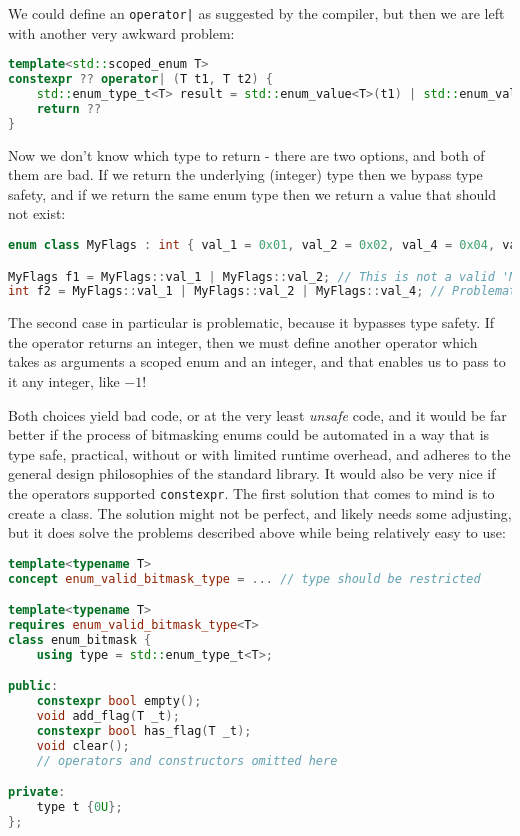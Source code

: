 \documentclass[
  format=manuscript,
  screen=true,
  review=false,
  nonacm=true,
  timestamp=true,
  balance=false]{acmart}
\newcommand{\beforecodespace}{\vspace{4mm}}
\begin{document}
We could define an \texttt{operator|} as suggested by the compiler, but then we are
left with another very awkward problem:

\beforecodespace\begin{lstlisting}[language=Cpp]
template<std::scoped_enum T>
constexpr ?? operator| (T t1, T t2) {
    std::enum_type_t<T> result = std::enum_value<T>(t1) | std::enum_value<T>(t2);
    return ??
}
\end{lstlisting}

\noindent
Now we don't know which type to return - there are two options, and both of them are
bad. If we return the underlying (integer) type then we bypass type safety, and if
we return the same enum type then we return a value that should not exist:

\beforecodespace\begin{lstlisting}[language=Cpp]
enum class MyFlags : int { val_1 = 0x01, val_2 = 0x02, val_4 = 0x04, val_8 = 0x08 };

MyFlags f1 = MyFlags::val_1 | MyFlags::val_2; // This is not a valid 'MyFlags' !
int f2 = MyFlags::val_1 | MyFlags::val_2 | MyFlags::val_4; // Problematic!
\end{lstlisting}

The second case in particular is problematic, because it bypasses type safety.
If the operator returns an integer, then we must define another operator which
takes as arguments a scoped enum and an integer, and that enables us to pass to
it any integer, like $-1$!

\noindent
Both choices yield bad code, or at the very least \textit{unsafe} code, and it
would be far better if the process of bitmasking enums could be automated in a
way that is type safe, practical, without or with limited runtime overhead, and
adheres to the general design philosophies of the standard library. It would
also be very nice if the operators supported \texttt{constexpr}. The first
solution that comes to mind is to create a class. The solution might not be
perfect, and likely needs some adjusting, but it does solve the problems
described above while being relatively easy to use:

\beforecodespace\begin{lstlisting}[language=Cpp]
template<typename T>
concept enum_valid_bitmask_type = ... // type should be restricted

template<typename T>
requires enum_valid_bitmask_type<T>
class enum_bitmask {
    using type = std::enum_type_t<T>;

public:
    constexpr bool empty();
    void add_flag(T _t);
    constexpr bool has_flag(T _t);
    void clear();
    // operators and constructors omitted here

private:
    type t {0U};
};
\end{lstlisting}
\end{document}
